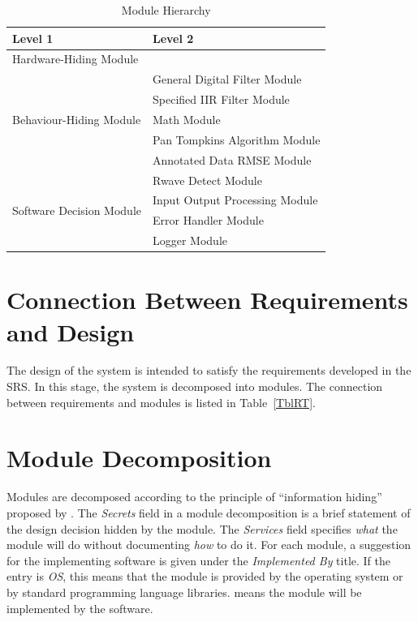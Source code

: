 \documentclass[12pt, titlepage]{article}
\begin{document}
\begin{table}[h!]
\centering
\begin{tabular}{p{} p{}}
\toprule
\textbf{Level 1} & \textbf{Level 2}\\
\midrule

{Hardware-Hiding Module} & ~ \\
\midrule

\multirow{5}{0.3\textwidth}{Behaviour-Hiding Module}
& General Digital Filter Module \\
& Specified IIR Filter Module \\
& Math Module \\
& Pan Tompkins Algorithm Module \\
& Annotated Data RMSE Module \\
\midrule

\multirow{4}{0.3\textwidth}{Software Decision Module}
& Rwave Detect Module \\
& Input Output Processing Module \\
& Error Handler Module \\
& Logger Module \\
\bottomrule

\end{tabular}
\caption{Module Hierarchy}
\label{TblMH}
\end{table}

\section{Connection Between Requirements and Design} \label{SecConnection}

The design of the system is intended to satisfy the requirements developed in
the SRS. In this stage, the system is decomposed into modules. The connection
between requirements and modules is listed in Table~\ref{TblRT}.

\section{Module Decomposition} \label{SecMD}

Modules are decomposed according to the principle of ``information hiding''
proposed by \citet{ParnasEtAl1984}. The \emph{Secrets} field in a module
decomposition is a brief statement of the design decision hidden by the module.
The \emph{Services} field specifies \emph{what} the module will do without
documenting \emph{how} to do it. For each module, a suggestion for the
implementing software is given under the \emph{Implemented By} title. If the
entry is \emph{OS}, this means that the module is provided by the operating
system or by standard programming language libraries.  \emph{\progname{}} means
the module will be implemented by the \progname{} software.
\end{document}
